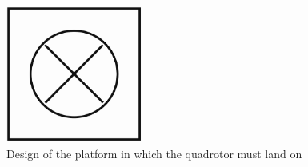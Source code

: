 \begin{figure}[!htbp]
    \centering
    \includegraphics[width=0.4\textwidth]{img/base.pdf}
    \caption{Design of the platform in which the quadrotor must land on}
    \label{fig:finalplatform}
\end{figure}


